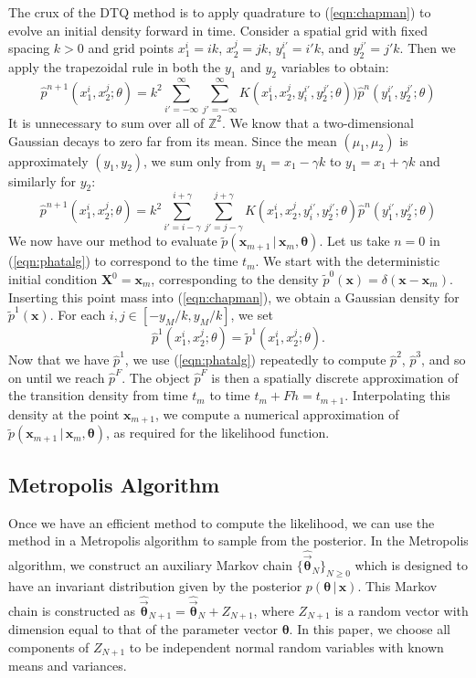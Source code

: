 \documentclass[graybox]{svmult}
\newcommand{\btheta}{\ensuremath{\boldsymbol{\theta}}}
\begin{document}
The crux of the DTQ method is to apply quadrature to (\ref{eqn:chapman}) to evolve an initial density forward in time.  Consider a spatial grid with fixed spacing $k > 0$ and grid points $x_1^i = ik$, $x_2^j = jk$, $y_1^{i'} = i'k$, and $y_2^{j'} = j'k$.  Then we apply the trapezoidal rule in both the $y_1$ and $y_2$ variables to obtain:
\begin{equation}
\hat{p}^{n+1}(x_1^i, x_2^j ;\theta) = k^2 \sum\limits_{i' = -\infty}^{\infty} \sum\limits_{j' = -\infty}^{\infty} K(x_1^i, x_2^j, y_i^{i'}, y_2^{j'}; \theta) ) \hat{p}^n(y_1^{i'}, y_2^{j'}; \theta)
\end{equation}
It is unnecessary to sum over all of $\mathbb{Z}^2$.  We know that a two-dimensional Gaussian decays to zero far from its mean.  Since the mean $(\mu_1,\mu_2)$ is approximately $(y_1,y_2)$, we sum only from $y_1 = x_1 - \gamma k$ to $y_1 = x_1 + \gamma k$ and similarly for $y_2$:
\begin{equation}
\label{eqn:phatalg}
\hat{p}^{n+1}(x_1^i, x_2^j;\theta ) = k^2 \sum\limits_{i' = i - \gamma}^{i+ \gamma} \sum\limits_{j' = j-\gamma}^{j+\gamma} K(x_1^i, x_2^j, y_i^{i'}, y_2^{j'}; \theta) \hat{p}^n(y_1^{i'}, y_2^{j'}; \theta)
\end{equation}
We now have our method to evaluate $\widetilde{p}(\mathbf{x}_{m+1} \, | \, \mathbf{x}_m, \btheta)$.  Let us take $n=0$ in (\ref{eqn:phatalg}) to correspond to the time $t_m$.  We start with the deterministic initial condition $\mathbf{X}^0 = \mathbf{x}_m$, corresponding to the density $\widetilde{p}^0(\mathbf{x}) = \delta(\mathbf{x} - \mathbf{x}_m)$.  Inserting this point mass into (\ref{eqn:chapman}), we obtain a Gaussian density for $\widetilde{p}^1(\mathbf{x})$.  For each $i,j \in [-y_M/k, y_M/k]$, we set
$$
\hat{p}^1(x_1^i, x_2^j; \theta) = \widetilde{p}^1(x_1^i, x_2^j; \theta).
$$
Now that we have $\hat{p}^1$, we use (\ref{eqn:phatalg}) repeatedly to compute $\hat{p}^2$, $\hat{p}^3$, and so on until we reach $\hat{p}^F$.  The object $\hat{p}^F$ is then a spatially discrete approximation of the transition density from time $t_m$ to time $t_m + Fh = t_{m+1}$.  Interpolating this density at the point $\mathbf{x}_{m+1}$, we compute a numerical approximation of $\widetilde{p}(\mathbf{x}_{m+1} \, | \, \mathbf{x}_m, \btheta)$, as required for the likelihood function.

\subsection{Metropolis Algorithm}
\label{subsec:2-2}
Once we have an efficient method to compute the likelihood, we can use the method in a Metropolis algorithm to sample from the posterior. In the Metropolis algorithm, we construct an auxiliary  Markov chain $\lbrace \hat{\vec{\btheta}}_N\rbrace_{N\geq 0}$ which is designed to have an invariant distribution given by the posterior $p(\btheta \, | \, \mathbf{x})$. This Markov chain is constructed as $\hat{\vec{\btheta}}_{N+1} = \hat{\vec{\btheta}}_N + Z_{N+1}$,
where $Z_{N+1}$ is a random vector with dimension equal to that of the parameter vector $\btheta$.  In this paper, we choose all components of $Z_{N+1}$ to be independent normal random variables with known means and variances.
\end{document}

